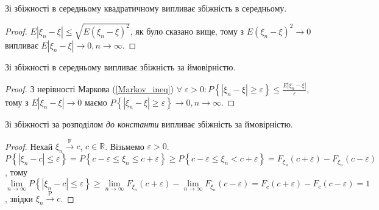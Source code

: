 \begin{proposition*} 
    Зі збіжності в середньому квадратичному випливає збіжність в середньому.
\end{proposition*}
\begin{proof}
    $E|\xi_n -\xi| \leq \sqrt{E(\xi_n - \xi)^2}$, як було сказано вище, тому з $E(\xi_n - \xi)^2 \to 0$
    випливає $E|\xi_n - \xi| \to 0, n\to\infty$.
\end{proof}
\begin{proposition*}
    Зі збіжності в середньому випливає збіжність за ймовірністю.
\end{proposition*}
\begin{proof}
    З нерівності Маркова (\ref{Markov_ineq})
    $\forall \; \varepsilon > 0: P\left\{|\xi_n - \xi| \geq \varepsilon\right\} \leq \frac{E|\xi_n - \xi|}{\varepsilon}$, 
    тому з $E|\xi_n - \xi| \to 0$ маємо $P\left\{|\xi_n - \xi| \geq \varepsilon\right\} \to 0, n\to\infty$.
\end{proof}
\begin{proposition*}
     Зі збіжності за розподілом \emph{до константи} випливає збіжність за ймовірністю.
\end{proposition*}
\begin{proof}
    Нехай $\xi_n \overset{\mathrm{F}}{\longrightarrow} c$, $c \in \mathbb{R}$. Візьмемо $\varepsilon > 0$.
    $P\left\{ |\xi_n - c| \leq \varepsilon\right\} = P\left\{ c - \varepsilon \leq \xi_n \leq c + \varepsilon \right\} \geq
    P\left\{ c - \varepsilon \leq \xi_n < c + \varepsilon \right\} = F_{\xi_n}(c+\varepsilon) - F_{\xi_n}(c-\varepsilon)$, тому
    $\underset{n \to \infty}{\lim} P\left\{ |\xi_n - c| \leq \varepsilon\right\} \geq \underset{n \to \infty}{\lim}  F_{\xi_n}(c+\varepsilon) -
    \underset{n \to \infty}{\lim}  F_{\xi_n}(c-\varepsilon) = F_c(c+\varepsilon) - F_c(c-\varepsilon) = 1$, звідки $\xi_n \overset{\mathrm{P}}{\longrightarrow} c$.
\end{proof}
